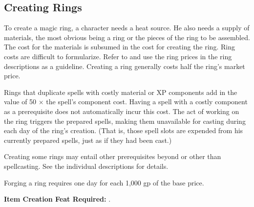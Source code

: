\subsection{Creating Rings}
To create a magic ring, a character needs a heat source. He also needs a supply of materials, the most obvious being a ring or the pieces of the ring to be assembled. The cost for the materials is subsumed in the cost for creating the ring. Ring costs are difficult to formularize. Refer to  and use the ring prices in the ring descriptions as a guideline. Creating a ring generally costs half the ring's market price.

Rings that duplicate spells with costly material or XP components add in the value of 50 $\times$ the spell's component cost. Having a spell with a costly component as a prerequisite does not automatically incur this cost. The act of working on the ring triggers the prepared spells, making them unavailable for casting during each day of the ring's creation. (That is, those spell slots are expended from his currently prepared spells, just as if they had been cast.)

Creating some rings may entail other prerequisites beyond or other than spellcasting. See the individual descriptions for details.

Forging a ring requires one day for each 1,000 gp of the base price.

\textbf{Item Creation Feat Required:} .
